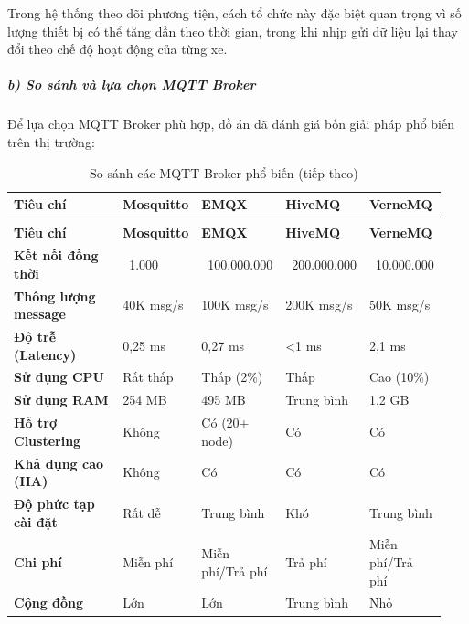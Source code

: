 \documentclass[a4paper]{extarticle}
\newcommand{\thesissettableid}[2]{%
  \renewcommand{\thetable}{#1}%
  \renewcommand{\theHtable}{#2}%
}
\begin{document}
Trong hệ thống theo dõi phương tiện, cách tổ chức này đặc biệt quan
trọng vì số lượng thiết bị có thể tăng dần theo thời gian, trong khi
nhịp gửi dữ liệu lại thay đổi theo chế độ hoạt động của từng xe.

\subparagraph{b) So sánh và lựa chọn MQTT
Broker}\label{b-so-suxe1nh-vuxe0-lux1ef1a-chux1ecdn-mqtt-broker}

Để lựa chọn MQTT Broker phù hợp, đồ án đã đánh giá bốn giải pháp phổ
biến trên thị trường:


{\thesissettableid{3.17}{tab-ch3-so-sanh-cac-mqtt-broker-pho-bien}
\def\LTcaptype{table}
\begin{longtable}{|L{0.269\linewidth}|L{0.188\linewidth}|L{0.158\linewidth}|L{0.152\linewidth}|L{0.177\linewidth}|}
\caption{So sánh các MQTT Broker phổ biến}\label{tab:ch3-so-sanh-cac-mqtt-broker-pho-bien}\\
\hline \textbf{Tiêu chí} & \textbf{Mosquitto} & \textbf{EMQX} & \textbf{HiveMQ} & \textbf{VerneMQ} \\
\hline
\endfirsthead
\caption[]{So sánh các MQTT Broker phổ biến (tiếp theo)}\\
\hline \textbf{Tiêu chí} & \textbf{Mosquitto} & \textbf{EMQX} & \textbf{HiveMQ} & \textbf{VerneMQ} \\
\hline
\endhead
\hline
\endfoot
\endlastfoot
\textbf{Kết nối đồng thời} & ~1.000 &
~100.000.000 & ~200.000.000 &
~10.000.000 \\\hline
\textbf{Thông lượng message} & 40K msg/s & 100K msg/s & 200K msg/s & 50K
msg/s \\\hline
\textbf{Độ trễ (Latency)} & 0,25 ms & 0,27 ms & \textless1 ms & 2,1
ms \\\hline
\textbf{Sử dụng CPU} & Rất thấp & Thấp (2\%) & Thấp & Cao (10\%) \\\hline
\textbf{Sử dụng RAM} & 254 MB & 495 MB & Trung bình & 1,2 GB \\\hline
\textbf{Hỗ trợ Clustering} & Không & Có (20+ node) & Có & Có \\\hline
\textbf{Khả dụng cao (HA)} & Không & Có & Có & Có \\\hline
\textbf{Độ phức tạp cài đặt} & Rất dễ & Trung bình & Khó & Trung bình \\\hline
\textbf{Chi phí} & Miễn phí & Miễn phí/Trả phí & Trả phí & Miễn phí/Trả
phí \\\hline
\textbf{Cộng đồng} & Lớn & Lớn & Trung bình & Nhỏ \\\hline
\end{longtable}
}
\end{document}
